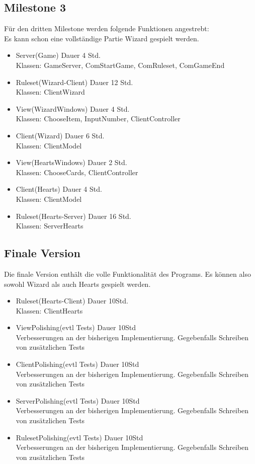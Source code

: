 \documentclass{article}
\begin{document}
\subsection{Milestone 3}
Für den dritten Milestone werden folgende Funktionen angestrebt:\\
Es kann schon eine vollständige Partie Wizard gespielt werden.\\
\begin{itemize}
\item Server(Game) Dauer 4 Std. \\
Klassen: GameServer, ComStartGame, ComRuleset, ComGameEnd
\item Ruleset(Wizard-Client) Dauer 12 Std. \\
Klassen: ClientWizard
\item View(WizardWindows) Dauer 4 Std. \\
Klassen: ChooseItem, InputNumber, ClientController
\item Client(Wizard) Dauer 6 Std. \\
Klassen: ClientModel
\item View(HeartsWindows) Dauer 2 Std. \\
Klassen: ChooseCards, ClientController
\item Client(Hearts) Dauer 4 Std. \\
Klassen: ClientModel
\item Ruleset(Hearts-Server) Dauer 16 Std. \\
Klassen: ServerHearts
\end{itemize}

\subsection{Finale Version}
Die finale Version enthält die volle Funktionalität des Programs.
Es können also sowohl Wizard als auch Hearts gespielt werden.\\
\begin{itemize}
\item Ruleset(Hearts-Client) Dauer 10Std. \\
Klassen: ClientHearts
\item ViewPolishing(evtl Tests) Dauer 10Std \\
Verbesserungen an der bisherigen Implementierung. Gegebenfalls Schreiben von zusätzlichen Tests
\item ClientPolishing(evtl Tests) Dauer 10Std \\
Verbesserungen an der bisherigen Implementierung. Gegebenfalls Schreiben von zusätzlichen Tests
\item ServerPolishing(evtl Tests) Dauer 10Std \\
Verbesserungen an der bisherigen Implementierung. Gegebenfalls Schreiben von zusätzlichen Tests
\item RulesetPolishing(evtl Tests) Dauer 10Std \\
Verbesserungen an der bisherigen Implementierung. Gegebenfalls Schreiben von zusätzlichen Tests
\end{itemize}
\newpage
\end{document}
